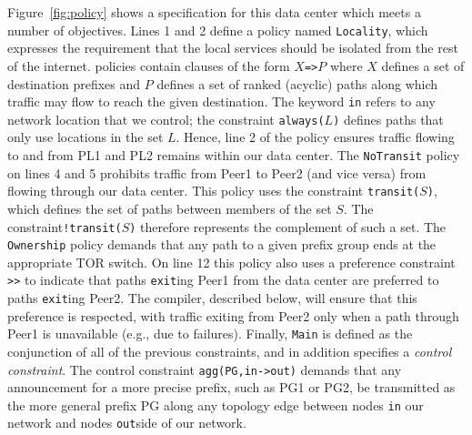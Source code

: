 Figure~\ref{fig:policy} shows a \Propane specification for this data center which meets a number of objectives.  Lines 1 and 2 define a policy named \texttt{Locality}, which expresses the requirement that
the local services should be isolated from the rest of the internet.  
\Propane policies contain clauses of the form
\texttt{$X$=>$P$} where $X$ defines a set of destination prefixes and 
$P$ defines a set of ranked (acyclic) paths along which traffic may flow 
to reach the given destination.  The keyword \texttt{in} refers to
any network location that we control; the constraint \texttt{always($L$)}
defines paths that only use locations in the set $L$.  Hence, line 2
of the policy ensures traffic flowing to and from PL1 and PL2 remains within
our data center.  The \texttt{NoTransit} policy on lines 4 and 5 prohibits traffic from Peer1 to Peer2 (and vice versa) from flowing through our data center.  This policy uses the constraint 
\texttt{transit($S$)}, which defines the set of paths between members of the set $S$.
The constraint\texttt{!transit($S$)} therefore represents the complement of such a set.
The \texttt{Ownership} policy demands that any path
to a given prefix group ends at the appropriate TOR switch.  On line 12 this policy also uses a preference constraint \texttt{>>} to indicate that paths \texttt{exit}ing Peer1 from the data center are preferred to paths \texttt{exit}ing Peer2.  The \Propane compiler, described below, will ensure that this preference is respected, with traffic exiting from Peer2 only when a path through Peer1 is unavailable (e.g., due to failures).  Finally,
\texttt{Main} is defined as the conjunction of all of the previous constraints,
and in addition specifies a \emph{control constraint}.  The control
constraint \texttt{agg(PG,in->out)} demands that any announcement
for a more precise prefix, such as PG1 or PG2, be transmitted as the
more general prefix PG along any topology edge between nodes \texttt{in}
our network and nodes \texttt{out}side of our network.

